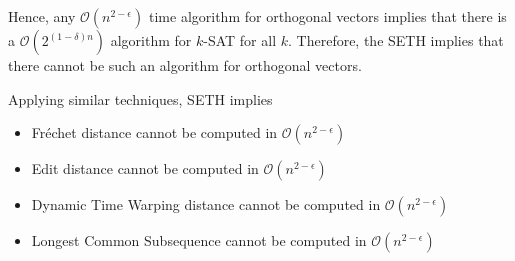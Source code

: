 Hence, any $\mathcal{O}(n^{2 - \epsilon})$ time algorithm for orthogonal vectors implies that there
is a $\mathcal{O}(2^{(1 - \delta)n})$ algorithm for $k$-SAT for all $k$. Therefore, the SETH
implies that there cannot be such an algorithm for orthogonal vectors.

Applying similar techniques, SETH implies
\begin{itemize}
    \item Fr\'echet distance cannot be computed in $\mathcal{O}(n^{2 - \epsilon})$ \cite{bringmann2014walking}
    \item Edit distance cannot be computed in $\mathcal{O}(n^{2 - \epsilon})$ \cite{backurs2015edit}
    \item Dynamic Time Warping distance cannot be computed in $\mathcal{O}(n^{2 - \epsilon})$ \cite{bringmann2015quadratic}
    \item Longest Common Subsequence cannot be computed in $\mathcal{O}(n^{2 - \epsilon})$ \cite{bringmann2018multivariate, polak2018hard}
\end{itemize}